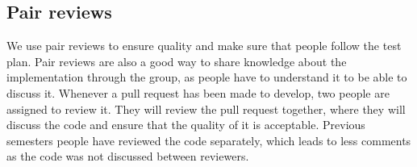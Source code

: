 \subsection{Pair reviews}
We use pair reviews to ensure quality and make sure that people follow the test plan.
Pair reviews are also a good way to share knowledge about the implementation through the group, as people have to understand it to be able to discuss it.
Whenever a pull request has been made to develop, two people are assigned to review it.
They will review the pull request together, where they will discuss the code and ensure that the quality of it is acceptable.
Previous semesters people have reviewed the code separately, which leads to less comments as the code was not discussed between reviewers.
